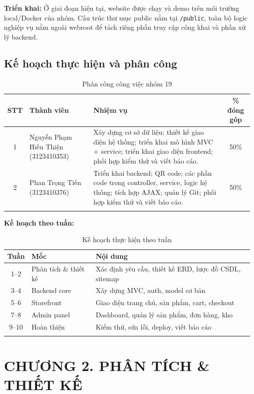 \documentclass[a4paper]{article}
\begin{document}
\textbf{Triển khai:} Ở giai đoạn hiện tại, website được chạy và demo trên môi trường local/Docker của nhóm. Cấu trúc thư mục public nằm tại \texttt{/public}, toàn bộ logic nghiệp vụ nằm ngoài webroot để tách riêng phần truy cập công khai và phần xử lý backend.

\subsection{Kế hoạch thực hiện và phân công}

\begin{longtable}{|c|p{3.5cm}|p{7cm}|c|}
\hline
\textbf{STT} & \textbf{Thành viên} & \textbf{Nhiệm vụ} & \textbf{\% đóng góp} \\
\hline
\endhead
1 & Nguyễn Phạm Hiếu Thiện (3123410353) &
    Xây dựng cơ sở dữ liệu; thiết kế giao diện hệ thống; triển khai mô hình MVC + service; triển khai giao diện frontend; phối hợp kiểm thử và viết báo cáo.
    & 50\% \\
\hline
2 & Phan Trọng Tiến (3123410376) &
    Triển khai backend; QR code; các phần code trong controller, service, logic hệ thống; tích hợp AJAX; quản lý Git; phối hợp kiểm thử và viết báo cáo.
    & 50\% \\
\hline
\caption{Phân công công việc nhóm 19}
\end{longtable}

\textbf{Kế hoạch theo tuần:}

\begin{longtable}{|c|p{4cm}|p{8cm}|}
\hline
\textbf{Tuần} & \textbf{Mốc} & \textbf{Nội dung} \\
\hline
\endhead
1--2 & Phân tích \& thiết kế & Xác định yêu cầu, thiết kế ERD, lược đồ CSDL, sitemap \\
\hline
3--4 & Backend core & Xây dựng MVC, auth, model cơ bản \\
\hline
5--6 & Storefront & Giao diện trang chủ, sản phẩm, cart, checkout \\
\hline
7--8 & Admin panel & Dashboard, quản lý sản phẩm, đơn hàng, kho \\
\hline
9--10 & Hoàn thiện & Kiểm thử, sửa lỗi, deploy, viết báo cáo \\
\hline
\caption{Kế hoạch thực hiện theo tuần}
\end{longtable}

\section{CHƯƠNG 2. PHÂN TÍCH \& THIẾT KẾ}
\end{document}
